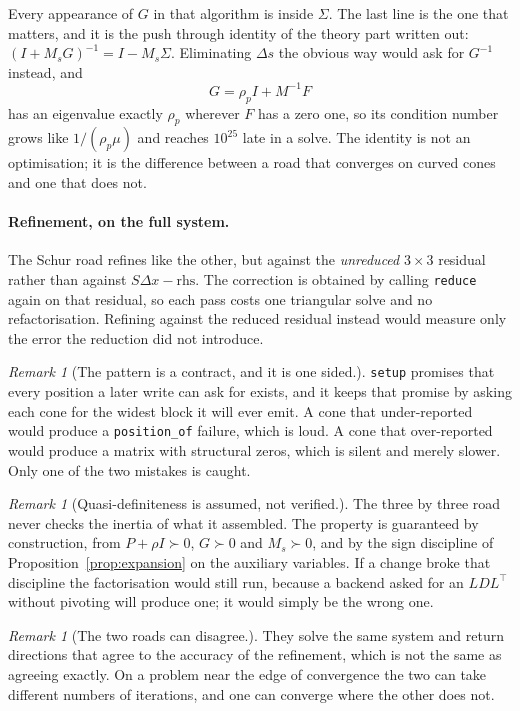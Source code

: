 \documentclass[a4paper,11pt]{book}
\theoremstyle{plain}
\theoremstyle{definition}
\theoremstyle{remark}
\newtheorem{remark}[theorem]{Remark}
\numberwithin{equation}{chapter}
\numberwithin{algorithm}{chapter}
\begin{document}
	Every appearance of $G$ in that algorithm is inside $\Sigma$. The last line is
	the one that matters, and it is the push through identity of the theory part
	written out: $(I+M_sG)^{-1}=I-M_s\Sigma$. Eliminating $\Delta s$ the obvious
	way would ask for $G^{-1}$ instead, and
	\[
	G=\rho_pI+M^{-1}F
	\]
	has an eigenvalue exactly $\rho_p$ wherever $F$ has a zero one, so its
	condition number grows like $1/(\rho_p\mu)$ and reaches $10^{25}$ late in a
	solve. The identity is not an optimisation; it is the difference between a
	road that converges on curved cones and one that does not.

	\paragraph{Refinement, on the full system.}
	The Schur road refines like the other, but against the \emph{unreduced} $3
	\times3$ residual rather than against $S\Delta x-\text{rhs}$. The correction
	is obtained by calling \texttt{reduce} again on that residual, so each pass
	costs one triangular solve and no refactorisation. Refining against the
	reduced residual instead would measure only the error the reduction did not
	introduce.

	\begin{remark}[The pattern is a contract, and it is one sided.]
		\texttt{setup} promises that every position a later write can ask for
		exists, and it keeps that promise by asking each cone for the widest block
		it will ever emit. A cone that under-reported would produce a
		\texttt{position\_of} failure, which is loud. A cone that over-reported
		would produce a matrix with structural zeros, which is silent and merely
		slower. Only one of the two mistakes is caught.
	\end{remark}

	\begin{remark}[Quasi-definiteness is assumed, not verified.]
		The three by three road never checks the inertia of what it assembled. The
		property is guaranteed by construction, from $P+\rho I\succ0$, $G\succ0$
		and $M_s\succ0$, and by the sign discipline of
		Proposition~\ref{prop:expansion} on the auxiliary variables. If a change
		broke that discipline the factorisation would still run, because a backend
		asked for an $LDL^{\top}$ without pivoting will produce one; it would simply
		be the wrong one.
	\end{remark}

	\begin{remark}[The two roads can disagree.]
		They solve the same system and return directions that agree to the accuracy
		of the refinement, which is not the same as agreeing exactly. On a problem
		near the edge of convergence the two can take different numbers of
		iterations, and one can converge where the other does not. 
	\end{remark}
\end{document}
